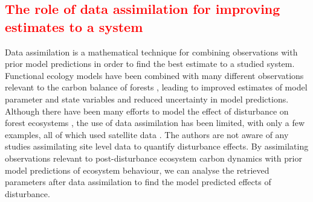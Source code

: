 \documentclass[draft,linenumbers]{agujournal}
\begin{document}
\subsection{\textcolor{red}{The role of data assimilation for improving estimates to a system}}
Data assimilation is a mathematical technique for combining observations with prior model predictions in order to find the best estimate to a studied system. Functional ecology models have been combined with many different observations relevant to the carbon balance of forests \citep{zobitz2011primer, fox2009reflex, richardson2010estimating, Quaife2008, Zobitz2014, Niu2014}, leading to improved estimates of model parameter and state variables and reduced uncertainty in model predictions. Although there have been many efforts to model the effect of disturbance on forest ecosystems \citep{seidl2011modelling, thornton2002modeling}, the use of data assimilation has been limited, with only a few examples, all of which used satellite data \citep{kantzas2015improving, hilker2009new}. The authors are not aware of any studies assimilating site level data to quantify disturbance effects. By assimilating observations relevant to post-disturbance ecosystem carbon dynamics with prior model predictions of ecosystem behaviour, we can analyse the retrieved parameters after data assimilation to find the model predicted effects of disturbance.   
\end{document}
